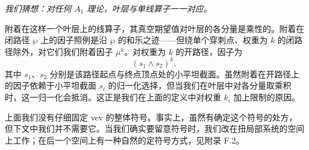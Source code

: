 \emph{我们猜想：对任何 $A_1$ 理论，叶层与单线算子一一对应。}

附着在这样一个叶层上的线算子，其真空期望值对叶层的各分量是乘性的。附着在闭路径 $\wp$ 上的因子照例是沿 $\wp$ 的和乐之迹——但绕单个穿刺点、权重为 $k$ 的闭路径除外，对它们我们附着因子 $\mu^k$。对权重为 $k$ 的开路径，因子为
\begin{equation} \label{eq:open-vev}
 (s_{1} \wedge s_{2})^{k},
\end{equation}
其中 $s_1$、$s_2$ 分别是该路径起点与终点顶点处的小平坦截面。虽然附着在开路径上的因子依赖于小平坦截面 $s_i$ 的归一化选择，但当我们在叶层中对各分量取乘积时，这一归一化会抵消。这正是我们在上面的定义中对权重 $k_i$ 加上限制的原因。

上面我们没有仔细固定 vev 的整体符号。事实上，虽然有确定这个符号的处方，但下文中我们并不需要它。当我们确实要留意符号时，我们改在扭局部系统的空间上工作；在后一个空间上有一种自然的定符号方式，见附录 F.2。%
